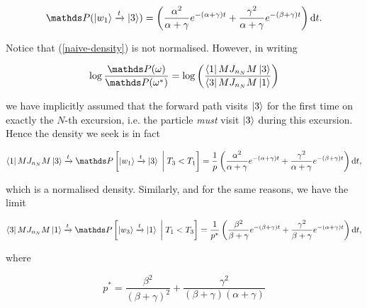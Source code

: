 \begin{align}\label{naive-density}
\bP(\ket{w_1}\xrightarrow{t} \ket{3}) = \left(\frac{\alpha^2}{\alpha + \gamma}e^{-(\alpha +\gamma)t} + \frac{\gamma^2}{\alpha+ \gamma} e^{-(\beta + \gamma)t}\right)\rmd t.
\end{align}

Notice that (\ref{naive-density}) is not normalised. However, in writing 

\begin{align} 
\log\frac{\bP(\omega)}{\bP(\omega^\ast)} = \log\left( \frac{\bra{1}MJ_{n_N}M\ket{3}}{\bra{3}MJ_{n_N}M\ket{1}}\right)
\end{align}

we have implicitly assumed that the forward path visits $\ket{3}$ for the first time on exactly the $N$-th excursion, i.e. the particle \textit{must} visit $\ket{3}$ during this excursion. Hence the density we seek is in fact 

\begin{align}
\bra{1}MJ_{n_N}M\ket{3} \xrightarrow{t}\bP \left [\ket{w_1} \xrightarrow[]{t}\ket{3} \; \bigg \lvert \; T_3 < T_1\right] = \frac{1}{p}\left(\frac{\alpha^2}{\alpha + \gamma}e^{-(\alpha +\gamma)t} + \frac{\gamma^2}{\alpha+ \gamma} e^{-(\beta + \gamma)t}\right)\rmd t,
\end{align}

which is a normalised density. Similarly, and for the same reasons, we have the limit 

\begin{align}
\bra{3}MJ_{n_N}M\ket{1} \xrightarrow{t}\bP \left [\ket{w_3}\xrightarrow[]{t}\ket{1} \; \bigg \lvert \; T_1 < T_3\right] =\frac{1}{p^\ast}\left(\frac{\beta^2}{\beta + \gamma}e^{-(\beta +\gamma)t} + \frac{\gamma^2}{\beta+ \gamma} e^{-(\alpha + \gamma)t}\right)\rmd t,
\end{align}

where

\begin{equation}
p^\ast = \frac{\beta^2}{(\beta + \gamma)^2}+ \frac{\gamma^2}{(\beta+\gamma)(\alpha + \gamma)}
\end{equation}


